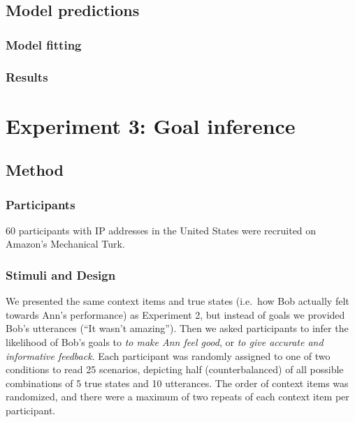 \documentclass[10pt, letterpaper]{article}
\begin{document}
\subsection{Model predictions}\label{model-predictions}

\subsubsection{Model fitting}\label{model-fitting}

\subsubsection{Results}\label{results-1}

\section{Experiment 3: Goal
inference}\label{experiment-3-goal-inference}

\subsection{Method}\label{method-2}

\subsubsection{Participants}\label{participants-2}

60 participants with IP addresses in the United States were recruited on
Amazon's Mechanical Turk.

\subsubsection{Stimuli and Design}\label{stimuli-and-design-2}

We presented the same context items and true states (i.e.~how Bob
actually felt towards Ann's performance) as Experiment 2, but instead of
goals we provided Bob's utterances (``It wasn't amazing''). Then we
asked participants to infer the likelihood of Bob's goals to \emph{to
make Ann feel good}, or \emph{to give accurate and informative
feedback}. Each participant was randomly assigned to one of two
conditions to read 25 scenarios, depicting half (counterbalanced) of all
possible combinations of 5 true states and 10 utterances. The order of
context items was randomized, and there were a maximum of two repeats of
each context item per participant.
\end{document}
